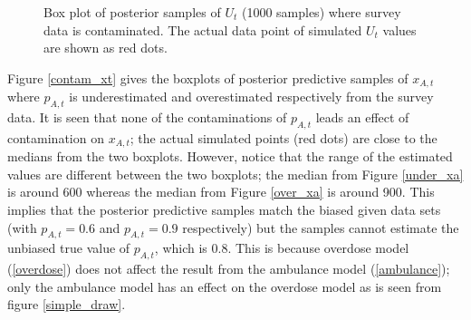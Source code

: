 \documentclass[12pt]{article}
\begin{document}
{\begin{figure}[htb]
	\centering
	\caption[Contaminated $p_{A,t}$: boxplot of posterior samples of $U_t$]{Box plot of posterior samples of $U_t$ (1000 samples) where survey data is contaminated.  The actual data point of simulated $U_t$ values are shown as red dots.}
	\label{contam_ut}
\end{figure}

Figure \ref{contam_xt}  gives the boxplots of posterior predictive samples of $x_{A,t}$ where $p_{A,t}$ is underestimated and overestimated respectively from the survey data. It is seen that none of the contaminations of $p_{A,t}$ leads an effect of contamination on $x_{A,t}$; the actual simulated points (red dots) are close to the medians from the two boxplots. However, notice that the range of the estimated values are different between the two boxplots; the median from Figure \ref{under_xa} is around 600 whereas the median from Figure \ref{over_xa} is around 900. This implies that the posterior predictive samples match the biased given data sets (with $p_{A,t}=0.6$ and $p_{A,t}=0.9$ respectively) but the samples cannot estimate the unbiased true value of $p_{A,t}$, which is 0.8. This is because overdose model (\ref{overdose}) does not affect the result from the ambulance model (\ref{ambulance}); only the ambulance model has an effect on the overdose model as is seen from figure \ref{simple_draw}.

}
\end{document}
